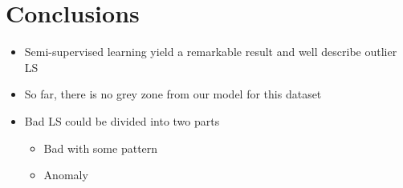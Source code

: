 \chapter{Conclusions}

\begin{itemize}
    \item Semi-supervised learning yield a remarkable result and well describe outlier LS
    \item So far, there is no grey zone from our model for this dataset
    \item Bad LS could be divided into two parts
    \begin{itemize}
        \item Bad with some pattern
        \item Anomaly
    \end{itemize}
\end{itemize}
